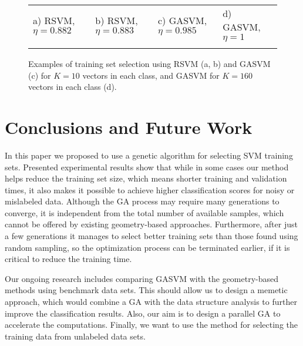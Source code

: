\documentclass{llncs}
\begin{document}
\begin{figure}
\centering

\renewcommand{\tabcolsep}{0cm}
\newcommand{\myfigwidth}{0.23}
\newcommand{\raiseshift}{0mm}

\begin{tabular}{llll}

\scriptsize a) RSVM, $\eta=0.882$ & \scriptsize b) RSVM, $\eta=0.883$ & \scriptsize c) GASVM, $\eta=0.985$ & \scriptsize d) GASVM, $\eta=1$\\

\\

\end{tabular}

  \caption
  {
    Examples of training set selection using RSVM (a, b) and GASVM (c) for $K=10$ vectors in each class, and GASVM for $K=160$ vectors in each class (d).
  }
  \label{fig:res_2D}
\end{figure}


\section{Conclusions and Future Work} \label{sec:concl}


In this paper we proposed to use a genetic algorithm for selecting
SVM training sets. Presented experimental results show that while in
some cases our method helps reduce the training set size, which
means shorter training and validation times, it also makes it
possible to achieve higher classification scores for noisy or mislabeled data. Although the GA process may require many generations
to converge, it is independent from the total number of available
samples, which cannot be offered by existing geometry-based
approaches. Furthermore, after just a few generations it manages to
select better training sets than those found using random sampling,
so the optimization process can be terminated earlier, if it is critical to reduce the training time.

Our ongoing research includes comparing GASVM with the geometry-based methods using
benchmark data sets. This should allow us to design a memetic
approach, which would combine a GA with the data structure analysis to further improve the classification results.
Also, our aim is to design a parallel GA to accelerate the computations. Finally, we want to use the method for selecting the
training data from unlabeled data sets.



\end{document}
